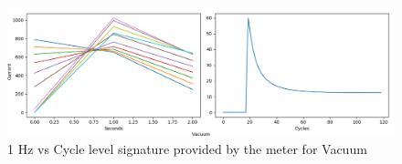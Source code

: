 \begin{figure} 
	\centering
	\includegraphics[width=1\linewidth]{images/H3Vacuum}
	\caption[1 Hz vs Cycle level signature provided by the meter for Vacuum]{1 Hz vs Cycle level signature provided by the meter for Vacuum}
	\label{fig:H3Vacuum}
\end{figure}
